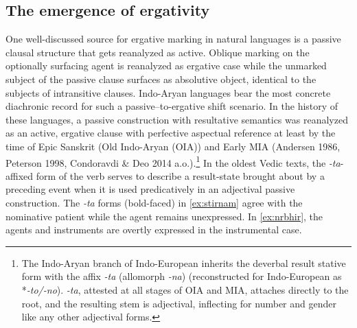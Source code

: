 \documentclass[output=paper,
modfonts
]{LSP/langsci}
\begin{document}
\subsection{The emergence of ergativity} 
One well-discussed source for ergative marking in natural languages is a passive clausal structure that gets reanalyzed as active. Oblique marking on the optionally surfacing  agent is reanalyzed as ergative case while the unmarked subject of the passive clause surfaces as absolutive object, identical to the subjects of intransitive clauses.  Indo-Aryan languages  bear the most concrete diachronic record for such a passive--to-ergative shift scenario. In the history of these languages, a passive construction with resultative semantics was reanalyzed as an active, ergative
clause with perfective aspectual reference at least by the time of Epic Sanskrit (Old Indo-Aryan (OIA)) and Early MIA (Andersen 1986, Peterson 1998, Condoravdi \& Deo 2014 a.o.).\footnote{The Indo-Aryan branch of Indo-European inherits the deverbal
result stative  form with the affix \textit{-ta}
(allomorph \textit{-na}) (reconstructed for Indo-European as *\textit{-to/-no}). \textit{-ta}, attested at all stages of  OIA and MIA, attaches directly to the root, and the resulting stem is adjectival,  inflecting for number and gender like any other adjectival forms.} In the oldest Vedic texts, the \textit{-ta}-affixed form of the verb serves to describe a result-state
brought about by a preceding event when it is used predicatively in
an adjectival passive construction. The \textit{-ta} forms (bold-faced) in \cref{ex:stirnam} agree
with the nominative patient while the agent remains unexpressed. In
\cref{ex:nrbhir}, the agents and instruments are overtly expressed in the instrumental
case.
\end{document}
